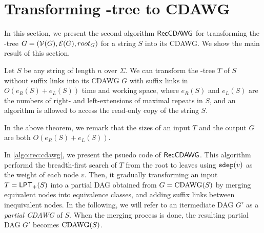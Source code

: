 \documentclass{article}
\begin{document}


\section{Transforming \LPTrm-tree to CDAWG}
\label{sec:lpt:to:cdawg}
In this section, we present the second algorithm $\textsf{RecCDAWG}$ for transforming the \LPTrm-tree $G = (\mathcal{V}(G), \mathcal{E}(G), root_G)$ for a string $S$ into its CDAWG.
We show the main result of this section.  

\begin{lemma}\label{lem:main:lpt:to:cdawg}
  Let $S$ be any string of length $n$ over $\Sigma$. 
  We can transform the \LPTrm-tree $T$ of $S$ without suffix links into its CDAWG $G$ with suffix links in $O(e_R(S) + e_L(S))$ time and working space, where $e_R(S)$ and $e_L(S)$ are the numbers of right- and left-extensions of maximal repeats in $S$, and an algorithm is allowed to access the read-only copy of the string $S$. 
\end{lemma}

In the above theorem, we remark that the sizes of an input $T$ and the output $G$ are both $O(e_R(S) + e_L(S))$. 

In \cref{algo:rec:cdawg}, we present the psuedo code of $\textsf{RecCDAWG}$. 
This algorithm performd the breadth-first search of $T$ from the root to leaves using $\mathtt{sdep}(v)$ as the weight of each node $v$. Then, it gradually transforming an input $T = \mathsf{LPT}_{+}(S)$ into a partial DAG obtained from $G = \mathrm{CDAWG}(S)$ by merging equivalent nodes into equivalence classes, and adding suffix links between inequivalent nodes. In the following, we will refer to an itermediate DAG $G'$ as a \textit{partial CDAWG} of $S$. When the merging process is done, the resulting partial DAG $G'$ becomes $\mathrm{CDAWG}(S)$.
\end{document}

